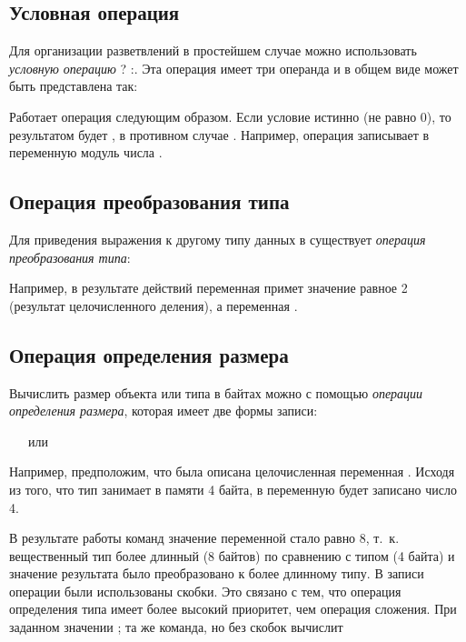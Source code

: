 \subsection[Условная операция]{Условная операция}
Для организации разветвлений в простейшем случае можно использовать \emph{условную
операцию} ? :. Эта операция имеет три операнда и в общем виде может быть представлена так:


Работает операция следующим образом. Если условие истинно (не равно 0), то результатом будет
, в противном случае . Например, операция
 записывает в переменную  модуль числа .


\subsection[Операция преобразования типа]{Операция преобразования типа}

Для приведения выражения к другому типу данных в  существует
\emph{операция преобразования типа}: 


Например, в результате действий  переменная  примет
значение равное 2 (результат целочисленного деления), а переменная .

\subsection[Операция определения размера]{Операция определения размера}
Вычислить размер объекта или типа в байтах можно с помощью \emph{операции определения размера}, которая
имеет две формы записи:

\ \ \  или\ \ \ 

Например, предположим, что была описана целочисленная переменная . Исходя
из того, что тип  занимает в памяти 4 байта, в переменную
 будет записано число 4.

В результате работы команд  
значение переменной  стало равно 8, т.~к. вещественный
тип  более длинный (8 байтов) по сравнению с типом
 (4 байта) и значение результата было преобразовано к более длинному типу. В
записи операции  были использованы скобки. Это
связано с тем, что операция определения типа имеет более высокий 
приоритет, чем операция сложения. При заданном
значении ; та же команда, но без скобок 
 вычислит 

